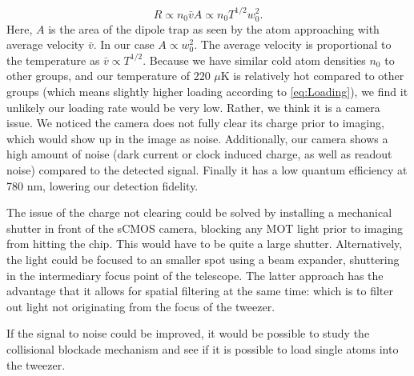 \begin{equation}\label{eq:Loading}
    R \propto n_0 \bar{v} A\propto n_0 T^{1/2} w_0^2.
\end{equation}
Here, $A$ is the area of the dipole trap as seen by the atom approaching with average velocity $\bar{v}$. 
In our case $A \propto w_0^2$.
The average velocity is proportional to the temperature as $\bar{v}\propto T^{1/2}$.
Because we have similar cold atom densities $n_0$ to other groups, and our temperature of $220$ $\mu$K is relatively hot compared to other groups (which means slightly higher loading according to \cref{eq:Loading}), we find it unlikely our loading rate would be very low. 
Rather, we think it is a camera issue. 
We noticed the camera does not fully clear its charge prior to imaging, which would show up in the image as noise. 
Additionally, our camera shows a high amount of noise (dark current or clock induced charge, as well as readout noise) compared to the detected signal.
Finally it has a low quantum efficiency at 780 nm, lowering our detection fidelity. 

The issue of the charge not clearing could be solved by installing a mechanical shutter in front of the sCMOS camera, blocking any MOT light prior to imaging from hitting the chip. 
This would have to be quite a large shutter.
Alternatively, the light could be focused to an smaller spot using a beam expander, shuttering in the intermediary focus point of the telescope. 
The latter approach has the advantage that it allows for spatial filtering at the same time: which is to filter out light not originating from the focus of the tweezer. 

If the signal to noise could be improved, it would be possible to study the collisional blockade mechanism and see if it is possible to load single atoms into the tweezer. 

 

